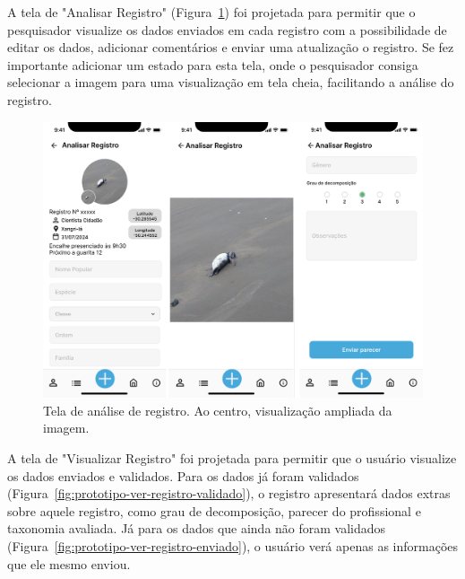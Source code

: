 A tela de "Analisar Registro" (Figura~\ref{fig:prototipo-avaliar-registro}) foi projetada para 
permitir que o pesquisador visualize os dados enviados em cada registro 
com a possibilidade de editar os dados, adicionar comentários e enviar uma atualização o registro.
Se fez importante adicionar um estado para esta tela, onde o pesquisador consiga selecionar a imagem
para uma visualização em tela cheia, facilitando a análise do registro.

\begin{figure}[H]
    \centering
    \includegraphics[height=0.55\textheight, width=\textwidth]{imagens/avaliar-registro-figma.png}
    \caption{Tela de análise de registro. Ao centro, visualização ampliada da imagem.}
    \label{fig:prototipo-avaliar-registro}
\end{figure}

A tela de "Visualizar Registro" foi projetada para permitir que o usuário visualize os dados
enviados e validados. Para os dados já foram validados 
(Figura~\ref{fig:prototipo-ver-registro-validado}), o registro apresentará dados extras 
sobre aquele registro, como grau de decomposição, parecer do profissional e taxonomia avaliada.
Já para os dados que ainda não foram validados (Figura~\ref{fig:prototipo-ver-registro-enviado}), 
o usuário verá apenas as informações que ele mesmo enviou.

